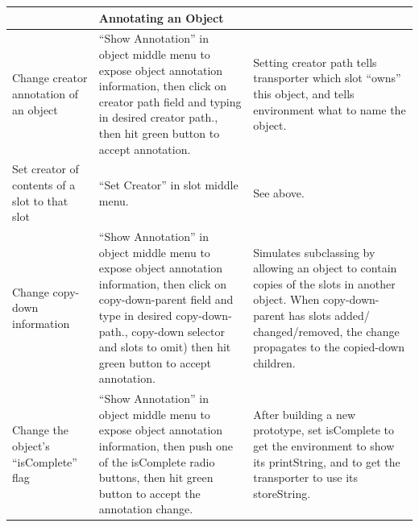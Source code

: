 \documentclass[letterpaper,10pt,english]{sphinxmanual}
\begin{document}
\begin{tabulary}{\linewidth}{p{5cm} p{5cm} p{5cm}}
\hline
 & 
\textbf{Annotating an Object}
 & \\\hline

Change creator annotation of an object
 & 
“Show Annotation” in object middle menu to expose object annotation information, then click on creator path field and typing in desired creator path., then hit green button to accept annotation.
 & 
Setting creator path tells transporter which slot “owns” this object, and tells environment what to name the object.
\\\hline

Set creator of contents of a slot to that slot
 & 
“Set Creator” in slot middle menu.
 & 
See above.
\\\hline

Change copy-down information
 & 
“Show Annotation” in object middle menu to expose object annotation information, then click on copy-down-parent field and type in desired copy-down-path., copy-down selector and slots to omit) then hit green button to accept annotation.
 & 
Simulates subclassing by allowing an object to contain copies of the slots in another object. When copy-down-parent has slots added/ changed/removed, the change propagates to the copied-down children.
\\\hline

Change the object’s “isComplete” flag
 & 
“Show Annotation” in object middle menu to expose object annotation information, then push one of the isComplete radio buttons, then hit green button to accept the annotation change.
 & 
After building a new prototype, set isComplete to get the environment to show its printString, and to get the transporter to use its storeString.
\\\hline
\end{tabulary}
\end{document}
